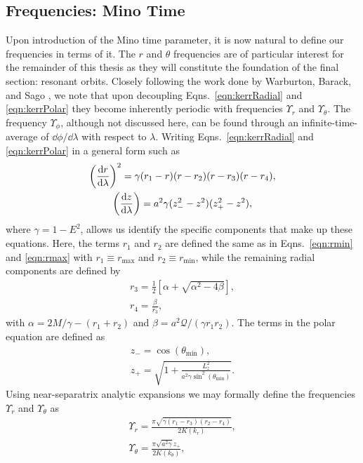 
\subsection{Frequencies: Mino Time}
Upon introduction of the Mino time parameter, it is now natural to define our frequencies in terms of it.
The $r$ and $\theta$ frequencies are of particular interest for the remainder of this thesis as they will constitute the foundation of the final section: resonant orbits.
Closely following the work done by Warburton, Barack, and Sago \cite{warburtonKerrGeodesics}, we note that upon decoupling Eqns.~\eqref{eqn:kerrRadial} and \eqref{eqn:kerrPolar} they become inherently periodic with frequencies $\Upsilon_r$ and $\Upsilon_\theta$.
The frequency $\Upsilon_\phi$, although not discussed here, can be found through an infinite-time-average of $\dd{\phi}/\dd{\lambda}$ with respect to $\lambda$.
Writing Eqns.~\eqref{eqn:kerrRadial} and \eqref{eqn:kerrPolar} in a general form such as
\begin{gather}
    \left(\dv{r}{\lambda}\right)^2=\gamma(r_1-r)(r-r_2)(r-r_3)(r-r_4),\\
    \left(\dv{z}{\lambda} \right) = a^2\gamma(z_-^2-z^2)(z_+^2-z^2),
\end{gather}
where $\gamma=1-E^2$, allows us identify the specific components that make up these equations.
Here, the terms $r_1$ and $r_2$ are defined the same as in Eqns.~\eqref{eqn:rmin} and \eqref{eqn:rmax} with $r_1\equiv r_{\text{max}}$ and $r_2\equiv r_\text{min}$, while the remaining radial components are defined by
\begin{gather}
r_3=\frac{1}{2}\left[\alpha+\sqrt{\alpha^2-4\beta} \right],\\
r_4=\frac{\beta}{r_3},
\end{gather}
with $\alpha=2M/\gamma - (r_1+r_2)$ and $\beta=a^2\mathcal{Q}/(\gamma r_1 r_2)$.
The terms in the polar equation are defined as
\begin{gather}
z_-=\cos(\theta_\text{min}),\\
z_+=\sqrt{1+\frac{L_z^2}{a^2\gamma\sin^2(\theta_\text{min})}}.
\end{gather}
Using near-separatrix analytic expansions we may formally define the frequencies $\Upsilon_r$ and $\Upsilon_\theta$ as
\begin{gather}
\Upsilon_r=\frac{\pi\sqrt{\gamma(r_1-r_3)(r_2-r_4)}}{2K(k_r)},\\
\Upsilon_\theta=\frac{\pi\sqrt{a^2\gamma}z_+}{2K(k_\theta)},
\end{gather}
